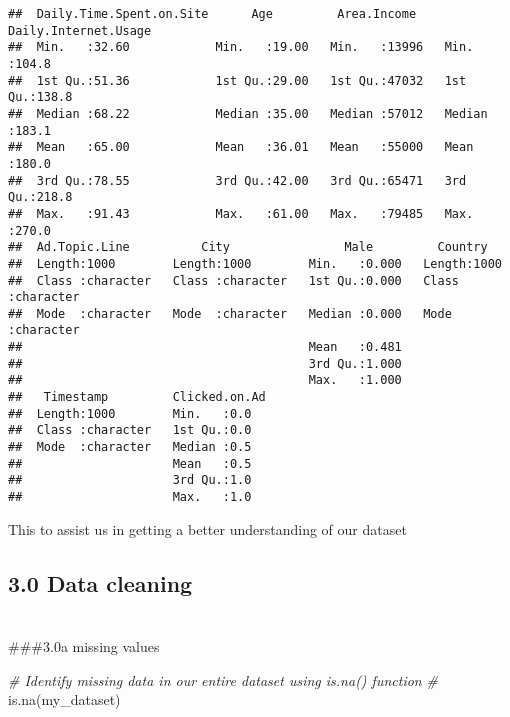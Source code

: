 \documentclass[
]{article}
\newenvironment{Shaded}{\begin{snugshade}}{\end{snugshade}}
\newcommand{\CommentTok}[1]{\textcolor[rgb]{0.56,0.35,0.01}{\textit{#1}}}
\newcommand{\FunctionTok}[1]{\textcolor[rgb]{0.00,0.00,0.00}{#1}}
\newcommand{\NormalTok}[1]{#1}
\begin{document}
\begin{verbatim}
##  Daily.Time.Spent.on.Site      Age         Area.Income    Daily.Internet.Usage
##  Min.   :32.60            Min.   :19.00   Min.   :13996   Min.   :104.8       
##  1st Qu.:51.36            1st Qu.:29.00   1st Qu.:47032   1st Qu.:138.8       
##  Median :68.22            Median :35.00   Median :57012   Median :183.1       
##  Mean   :65.00            Mean   :36.01   Mean   :55000   Mean   :180.0       
##  3rd Qu.:78.55            3rd Qu.:42.00   3rd Qu.:65471   3rd Qu.:218.8       
##  Max.   :91.43            Max.   :61.00   Max.   :79485   Max.   :270.0       
##  Ad.Topic.Line          City                Male         Country         
##  Length:1000        Length:1000        Min.   :0.000   Length:1000       
##  Class :character   Class :character   1st Qu.:0.000   Class :character  
##  Mode  :character   Mode  :character   Median :0.000   Mode  :character  
##                                        Mean   :0.481                     
##                                        3rd Qu.:1.000                     
##                                        Max.   :1.000                     
##   Timestamp         Clicked.on.Ad
##  Length:1000        Min.   :0.0  
##  Class :character   1st Qu.:0.0  
##  Mode  :character   Median :0.5  
##                     Mean   :0.5  
##                     3rd Qu.:1.0  
##                     Max.   :1.0
\end{verbatim}

This to assist us in getting a better understanding of our dataset

\hypertarget{data-cleaning}{%
\subsection{3.0 Data cleaning}\label{data-cleaning}}

\hypertarget{section}{%
\section{}\label{section}}

\#\#\#3.0a missing values

\begin{Shaded}
\begin{Highlighting}[]
\CommentTok{\# Identify missing data in our entire dataset using is.na() function}
\CommentTok{\#}
\FunctionTok{is.na}\NormalTok{(my\_dataset)}
\end{Highlighting}
\end{Shaded}
\end{document}
